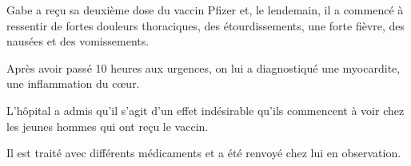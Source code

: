 Gabe a reçu sa deuxième dose du vaccin Pfizer et, le lendemain, il a commencé à
ressentir de fortes douleurs thoraciques, des étourdissements, une forte fièvre,
des nausées et des vomissements.

Après avoir passé 10 heures aux urgences, on lui a diagnostiqué une myocardite,
une inflammation du cœur.

L'hôpital a admis qu'il s'agit d'un effet indésirable qu'ils commencent à voir
chez les jeunes hommes qui ont reçu le vaccin.

Il est traité avec différents médicaments et a été renvoyé chez lui en
observation.

